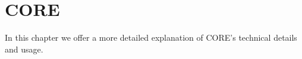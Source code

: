 
\chapter{CORE}
\label{ch:core}

In this chapter we offer a more detailed explanation of CORE's technical details and usage.







